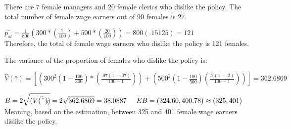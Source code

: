 \documentclass{article}
\begin{document}
There are 7 female managers and 20 female clerics who dislike the policy. The total number of female wage earners out of 90 females is 27. \\
\begin{center}
    $\hat{p_{st}} = \frac{1}{800} (300*(\frac{7}{100}) + 500*(\frac{20}{100})) = 800(.15125) = 121 $ \\
    \smallskip
    Therefore, the total of female wage earners who dislike the policy is 121 females. 
\end{center}
The variance of the proportion of females who dislike the policy is: 
\begin{center}
    $\hat{V}(\hat{\tau}) = [(300^2(1- \frac{100}{300})*(\frac{.07(1-.07)}{100-1})) + (500^2(1- \frac{100}{500})(\frac{.2(1-.2)}{100-1}))] = 362.6869 $ \\
\end{center}
\begin{center}
    $B = 2\sqrt{(\hat{V(\hat{\tau}))}} = 2\sqrt{362.6869} = 38.0887 \hspace{.5cm} EB = (324.60, 400.78) \approx (325, 401)$ \\
    \smallskip
    Meaning, based on the estimation, between 325 and 401 female wage earners dislike the policy. \\
\end{center}
\end{document}
